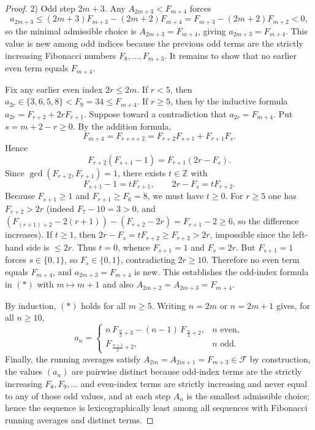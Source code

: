 \begin{proof}
2) Odd step $2m+3$. Any $A_{2m+3}<F_{m+4}$ forces
$$a_{2m+3}\le (2m+3)F_{m+3}-(2m+2)F_{m+4}=F_{m+3}-(2m+2)F_{m+2}<0,$$
so the minimal admissible choice is $A_{2m+3}=F_{m+4}$, giving $a_{2m+3}=F_{m+4}$. This value is new among odd indices because the previous odd terms are the strictly increasing Fibonacci numbers $F_8,\dots,F_{m+3}$. It remains to show that no earlier even term equals $F_{m+4}$.

Fix any earlier even index $2r\le 2m$. If $r<5$, then $a_{2r}\in\{3,6,5,8\}<F_9=34\le F_{m+4}$. If $r\ge5$, then by the inductive formula $a_{2r}=F_{r+2}+2rF_{r+1}$. Suppose toward a contradiction that $a_{2r}=F_{m+4}$. Put $s=m+2-r\ge0$. By the addition formula,
$$
F_{m+4}=F_{r+s+2}=F_{r+2}F_{s+1}+F_{r+1}F_s.
$$
Hence
$$
F_{r+2}(F_{s+1}-1)=F_{r+1}(2r-F_s).
$$
Since $\gcd(F_{r+2},F_{r+1})=1$, there exists $t\in\mathbb Z$ with
$$
F_{s+1}-1=tF_{r+1},\qquad 2r-F_s=tF_{r+2}.
$$
Because $F_{s+1}\ge1$ and $F_{r+1}\ge F_6=8$, we must have $t\ge0$. For $r\ge5$ one has $F_{r+2}>2r$ (indeed $F_7-10=3>0$, and $(F_{(r+1)+2}-2(r+1))-(F_{r+2}-2r)=F_{r+1}-2\ge6$, so the difference increases). If $t\ge1$, then $2r-F_s=tF_{r+2}\ge F_{r+2}>2r$, impossible since the left-hand side is $\le 2r$. Thus $t=0$, whence $F_{s+1}=1$ and $F_s=2r$. But $F_{s+1}=1$ forces $s\in\{0,1\}$, so $F_s\in\{0,1\}$, contradicting $2r\ge10$. Therefore no even term equals $F_{m+4}$, and $a_{2m+3}=F_{m+4}$ is new. This establishes the odd-index formula in $(\ast)$ with $m\mapsto m+1$ and also $A_{2m+2}=A_{2m+3}=F_{m+4}$.

By induction, $(\ast)$ holds for all $m\ge5$. Writing $n=2m$ or $n=2m+1$ gives, for all $n\ge10$,
$$
 a_n=
 \begin{cases}
 n\,F_{\,\frac n2+3}-(n-1)\,F_{\,\frac n2+2}, & n\text{ even},\\[4pt]
 F_{\,\frac{n+1}{2}+2}, & n\text{ odd}.
 \end{cases}
$$
Finally, the running averages satisfy $A_{2m}=A_{2m+1}=F_{m+3}\in\mathcal F$ by construction, the values $(a_n)$ are pairwise distinct because odd-index terms are the strictly increasing $F_8,F_9,\dots$ and even-index terms are strictly increasing and never equal to any of those odd values, and at each step $A_n$ is the smallest admissible choice; hence the sequence is lexicographically least among all sequences with Fibonacci running averages and distinct terms. 
\end{proof}
